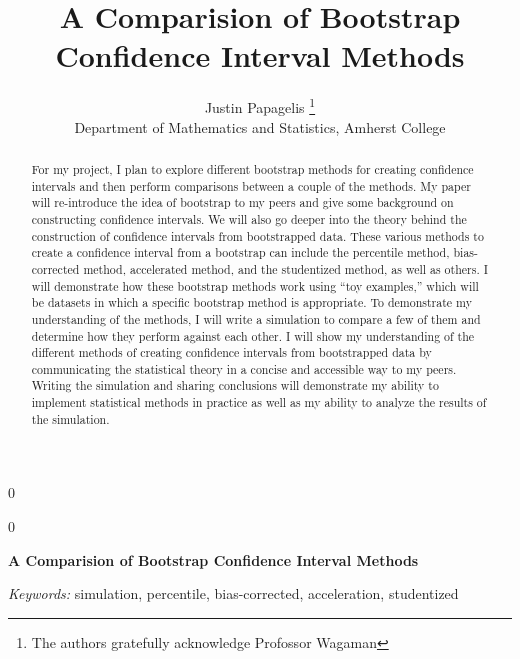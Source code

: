 \documentclass[12pt]{article}
\newcommand{\blind}{0}
\begin{document}
\def\spacingset#1{\renewcommand{\baselinestretch}%
{#1}\small\normalsize} \spacingset{1}



\blind
{
  \title{\bf A Comparision of Bootstrap Confidence Interval Methods}

  \author{
        Justin Papagelis \thanks{The authors gratefully acknowledge
Profossor Wagaman} \\
    Department of Mathematics and Statistics, Amherst College\\
      }
  \maketitle
} \fi

\blind
{
  \bigskip
  \bigskip
  \bigskip
  \begin{center}
    {\LARGE\bf A Comparision of Bootstrap Confidence Interval Methods}
  \end{center}
  \medskip
} \fi

\bigskip
\begin{abstract}
For my project, I plan to explore different bootstrap methods for
creating confidence intervals and then perform comparisons between a
couple of the methods. My paper will re-introduce the idea of bootstrap
to my peers and give some background on constructing confidence
intervals. We will also go deeper into the theory behind the
construction of confidence intervals from bootstrapped data. These
various methods to create a confidence interval from a bootstrap can
include the percentile method, bias-corrected method, accelerated
method, and the studentized method, as well as others. I will
demonstrate how these bootstrap methods work using ``toy examples,''
which will be datasets in which a specific bootstrap method is
appropriate. To demonstrate my understanding of the methods, I will
write a simulation to compare a few of them and determine how they
perform against each other. I will show my understanding of the
different methods of creating confidence intervals from bootstrapped
data by communicating the statistical theory in a concise and accessible
way to my peers. Writing the simulation and sharing conclusions will
demonstrate my ability to implement statistical methods in practice as
well as my ability to analyze the results of the simulation.
\end{abstract}

\noindent%
{\it Keywords:} simulation, percentile, bias-corrected, acceleration, studentized
\vfill
\end{document}
